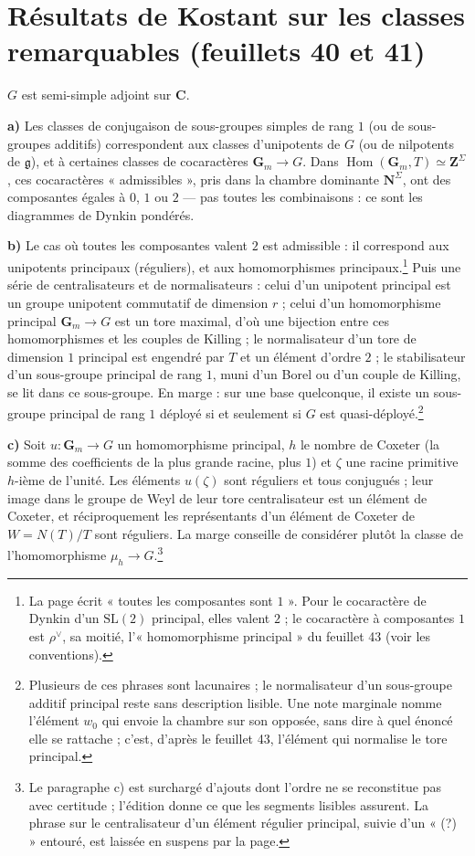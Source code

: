 \documentclass[11pt,a4paper]{article}
\begin{document}
\section*{Résultats de Kostant sur les classes remarquables (feuillets 40 et 41)}

$G$ est semi-simple adjoint sur $\mathbf{C}$.

\textbf{a)} Les classes de conjugaison de sous-groupes simples de rang $1$
(ou de sous-groupes additifs) correspondent aux classes d'unipotents de $G$
(ou de nilpotents de $\mathfrak{g}$), et à certaines classes de cocaractères
$\mathbf{G}_{m}\to G$. Dans $\operatorname{Hom}(\mathbf{G}_{m},T)\simeq
\mathbf{Z}^{\Sigma}$, ces cocaractères « admissibles », pris dans la chambre
dominante $\mathbf{N}^{\Sigma}$, ont des composantes égales à $0$, $1$ ou $2$
— pas toutes les combinaisons : ce sont les diagrammes de Dynkin pondérés.

\textbf{b)} Le cas où toutes les composantes valent $2$ est admissible : il
correspond aux unipotents principaux (réguliers), et aux homomorphismes
principaux.\footnote{La page écrit « toutes les composantes sont $1$ ». Pour le
cocaractère de Dynkin d'un $\mathrm{SL}(2)$ principal, elles valent $2$ ; le
cocaractère à composantes $1$ est $\rho^{\vee}$, sa moitié, l'« homomorphisme
principal » du feuillet 43 (voir les conventions).} Puis une série de
centralisateurs et de normalisateurs : celui d'un unipotent principal est un
groupe unipotent commutatif de dimension $r$ ; celui d'un homomorphisme
principal $\mathbf{G}_{m}\to G$ est un tore maximal, d'où une bijection entre
ces homomorphismes et les couples de Killing ; le normalisateur d'un tore de
dimension $1$ principal est engendré par $T$ et un élément d'ordre $2$ ; le
stabilisateur d'un sous-groupe principal de rang $1$, muni d'un Borel ou d'un
couple de Killing, se lit dans ce sous-groupe. En marge : sur une base
quelconque, il existe un sous-groupe principal de rang $1$ déployé si et
seulement si $G$ est quasi-déployé.\footnote{Plusieurs de ces phrases sont
lacunaires ; le normalisateur d'un sous-groupe additif principal reste sans
description lisible. Une note marginale nomme l'élément $w_{0}$ qui envoie la
chambre sur son opposée, sans dire à quel énoncé elle se rattache ; c'est,
d'après le feuillet 43, l'élément qui normalise le tore principal.}

\textbf{c)} Soit $u\colon\mathbf{G}_{m}\to G$ un homomorphisme principal, $h$
le nombre de Coxeter (la somme des coefficients de la plus grande racine, plus
$1$) et $\zeta$ une racine primitive $h$-ième de l'unité. Les éléments
$u(\zeta)$ sont réguliers et tous conjugués ; leur image dans le groupe de Weyl
de leur tore centralisateur est un élément de Coxeter, et réciproquement les
représentants d'un élément de Coxeter de $W=N(T)/T$ sont réguliers. La marge
conseille de considérer plutôt la classe de l'homomorphisme
$\mu_{h}\to G$.\footnote{Le paragraphe c) est surchargé d'ajouts dont l'ordre
ne se reconstitue pas avec certitude ; l'édition donne ce que les segments
lisibles assurent. La phrase sur le centralisateur d'un élément régulier
principal, suivie d'un « (?) » entouré, est laissée en suspens par la page.}
\end{document}
